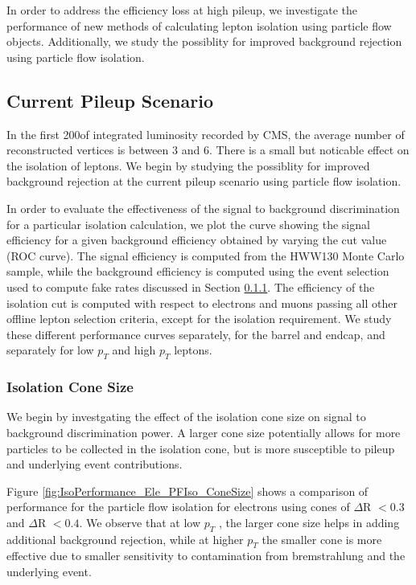 

In order to address the efficiency loss at high pileup, we investigate the performance of 
new methods of calculating lepton isolation using particle flow objects. Additionally, we
study the possiblity for improved background rejection using particle flow isolation.

\subsection{Current Pileup Scenario}

In the first 200\ipb of integrated luminosity recorded by CMS, the average number of 
reconstructed vertices is between $3$ and $6$. There is a small but noticable effect 
on the isolation of leptons. We begin by studying the possiblity for improved background
rejection at the current pileup scenario using particle flow isolation.

In order to evaluate the effectiveness of the signal to background discrimination for 
a particular isolation calculation, we plot the curve showing the signal efficiency
for a given background efficiency obtained by varying the cut value (ROC curve). The
signal efficiency is computed from the HWW130 Monte Carlo sample, while the background
efficiency is computed using the event selection used to compute fake rates discussed
in Section \ref{}. The efficiency of the isolation cut is computed with respect to
electrons and muons passing all other offline lepton selection criteria, except for
the isolation requirement. We study these different performance curves separately,
for the barrel and endcap, and separately for low $p_{T}$ and high $p_{T}$ leptons.

\subsubsection{Isolation Cone Size}

We begin by investgating the effect of the isolation cone size on signal to background
discrimination power. A larger cone size potentially allows for more particles to be 
collected in the isolation cone, but is more susceptible to pileup and underlying event
contributions. 

Figure \ref{fig:IsoPerformance_Ele_PFIso_ConeSize} shows a comparison of performance
for the particle flow isolation for electrons using cones of $\Delta$R $<0.3$ and 
$\Delta$R $<0.4$. We observe that at low $p_{T}$ , the larger cone size helps in 
adding additional background rejection, while at higher $p_{T}$ the smaller cone
is more effective due to smaller sensitivity to contamination from 
bremstrahlung and the underlying event. 

